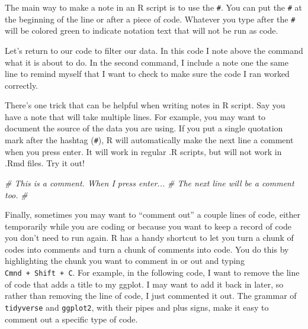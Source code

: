 \documentclass[
]{book}
\newenvironment{Shaded}{\begin{snugshade}}{\end{snugshade}}
\newcommand{\CommentTok}[1]{\textcolor[rgb]{0.56,0.35,0.01}{\textit{#1}}}
\newcommand{\DecValTok}[1]{\textcolor[rgb]{0.00,0.00,0.81}{#1}}
\newcommand{\FunctionTok}[1]{\textcolor[rgb]{0.00,0.00,0.00}{#1}}
\newcommand{\NormalTok}[1]{#1}
\newcommand{\OtherTok}[1]{\textcolor[rgb]{0.56,0.35,0.01}{#1}}
\newcommand{\SpecialCharTok}[1]{\textcolor[rgb]{0.00,0.00,0.00}{#1}}
\begin{document}
The main way to make a note in an R script is to use the \texttt{\#}. You can put the \texttt{\#} at the beginning of the line or after a piece of code. Whatever you type after the \texttt{\#} will be colored green to indicate notation text that will not be run as code.

Let's return to our code to filter our data. In this code I note above the command what it is about to do. In the second command, I include a note one the same line to remind myself that I want to check to make sure the code I ran worked correctly.

\begin{Shaded}
\end{Shaded}

There's one trick that can be helpful when writing notes in R script. Say you have a note that will take multiple lines. For example, you may want to document the source of the data you are using. If you put a single quotation mark after the hashtag (\texttt{\#\textquotesingle{}}), R will automatically make the next line a comment when you press enter. It will work in regular .R scripts, but will not work in .Rmd files. Try it out!

\begin{Shaded}
\begin{Highlighting}[]
\CommentTok{\#\textquotesingle{} This is a comment. When I press enter...}
\CommentTok{\#\textquotesingle{} The next line will be a comment too.}
\CommentTok{\#\textquotesingle{}}
\end{Highlighting}
\end{Shaded}

Finally, sometimes you may want to ``comment out'' a couple lines of code, either temporarily while you are coding or because you want to keep a record of code you don't need to run again. R has a handy shortcut to let you turn a chunk of codes into comments and turn a chunk of comments into code. You do this by highlighting the chunk you want to comment in or out and typing \texttt{Cmnd\ +\ Shift\ +\ C}. For example, in the following code, I want to remove the line of code that adds a title to my ggplot. I may want to add it back in later, so rather than removing the line of code, I just commented it out. The grammar of \texttt{tidyverse} and \texttt{ggplot2}, with their pipes and plus signs, make it easy to comment out a specific type of code.
\end{document}
